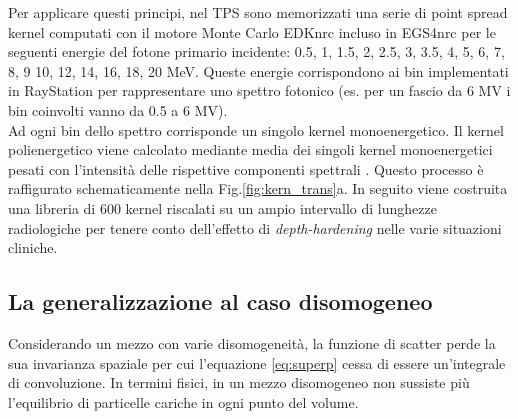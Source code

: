 {Per applicare questi principi, nel TPS sono memorizzati una serie di point spread kernel computati con il motore Monte Carlo EDKnrc incluso in EGS4nrc per le seguenti energie del fotone primario incidente: 0.5, 1, 1.5, 2, 2.5, 3, 3.5, 4, 5, 6, 7, 8, 9 10, 12, 14, 16, 18, 20 MeV. Queste energie corrispondono ai bin implementati in RayStation per rappresentare uno spettro fotonico (es. per un fascio da 6 MV i bin coinvolti vanno da 0.5 a 6 MV).\\
Ad ogni bin dello spettro corrisponde un singolo kernel monoenergetico. Il kernel polienergetico viene calcolato mediante media dei singoli kernel monoenergetici pesati con l'intensità delle rispettive componenti spettrali  \cite{Papanikolaou1993}. Questo processo è raffigurato schematicamente nella Fig.\ref{fig:kern_trans}a.
In seguito viene costruita una libreria di 600 kernel riscalati su un ampio intervallo di lunghezze radiologiche per tenere conto dell'effetto di \textit{depth-hardening} nelle varie situazioni cliniche.


\subsection{La generalizzazione al caso disomogeneo}

Considerando un mezzo con varie disomogeneità, la funzione di scatter perde la sua invarianza spaziale per cui l'equazione \eqref{eq:superp} cessa di essere un'integrale di convoluzione. In termini fisici, in un mezzo disomogeneo non sussiste più l'equilibrio di particelle cariche in ogni punto del volume.

}
